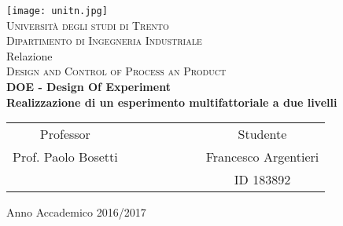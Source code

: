 \begin{titlepage}
 \begin{center}
 \texttt{[image: unitn.jpg]}\\
 \vspace{1em}
 {\Large \textsc{Università degli studi di Trento}}\\
 \vspace{1em}
 {\Large \textsc{Dipartimento di Ingegneria Industriale}}\\
 \vspace{4em}
 {\normalsize Relazione}\\
 \vspace{1em}
 {\Large \textsc{Design and Control of Process an Product}}\\
 \vspace{4em}
 {\LARGE\textbf{
 	DOE - Design Of Experiment\\[0.2cm]
 	Realizzazione di un esperimento multifattoriale a due livelli
 }}\\
 \end{center}

\vskip 2.0cm
 \begin{center}
 \begin{tabular}{c c c c c c c c}
 Professor & & & & & & & Studente \\[0.2cm]
 \large{Prof. Paolo Bosetti} & & & & & & & \large{Francesco Argentieri}\\[0.4cm]
  & & & & & & & ID 183892\\[0.2cm]
 \end{tabular}
 \end{center}

\vskip 2.5cm
\begin{center}
{\normalsize Anno Accademico 2016/2017}
\end{center}
\end{titlepage}

\clearpage{\pagestyle{empty}\cleardoublepage}
